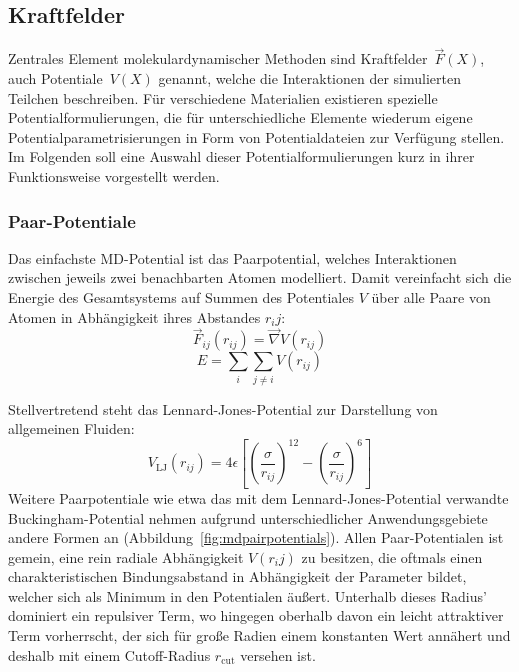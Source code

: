 \subsection{Kraftfelder}
\label{mdforcefields}

Zentrales Element molekulardynamischer Methoden sind Kraftfelder~$\vec F(X)$, auch Potentiale~$V(X)$ genannt, welche die Interaktionen der simulierten Teilchen beschreiben.
Für verschiedene Materialien existieren spezielle Potentialformulierungen, die für unterschiedliche Elemente wiederum eigene Potentialparametrisierungen in Form von Potentialdateien zur Verfügung stellen.
Im Folgenden soll eine Auswahl dieser Potentialformulierungen kurz in ihrer Funktionsweise vorgestellt werden.

\subsubsection{Paar-Potentiale}

Das einfachste MD-Potential ist das Paarpotential, welches Interaktionen zwischen jeweils zwei benachbarten Atomen modelliert.
Damit vereinfacht sich die Energie des Gesamtsystems auf Summen des Potentiales $V$ über alle Paare von Atomen in Abhängigkeit ihres Abstandes $r_ij$:
\begin{equation}
  \vec F_{ij}(r_{ij}) = \vec\nabla V(r_{ij})
\end{equation}
\begin{equation}
  E = \sum_i\sum_{j \neq i}{V(r_{ij})}
\end{equation}

Stellvertretend steht das Lennard-Jones-Potential zur Darstellung von allgemeinen Fluiden:
\begin{equation}
  V_\text{LJ}(r_{ij}) = 4 \epsilon \left[\left(\frac{\sigma}{r_{ij}}\right)^{12} - \left(\frac{\sigma}{r_{ij}}\right)^{6}\right]
\end{equation}
Weitere Paarpotentiale wie etwa das mit dem Lennard-Jones-Potential verwandte Bucking\-ham-Potential nehmen aufgrund unterschiedlicher Anwendungsgebiete andere Formen an (Abbildung~\ref{fig:mdpairpotentials}).
Allen Paar-Potentialen ist gemein, eine rein radiale Abhängigkeit $V(r_ij)$ zu besitzen, die oftmals einen charakteristischen Bindungsabstand in Abhängigkeit der Parameter bildet, welcher sich als Minimum in den Potentialen äußert.
Unterhalb dieses Radius' dominiert ein repulsiver Term, wo hingegen oberhalb davon ein leicht attraktiver Term vorherrscht, der sich für große Radien einem konstanten Wert annähert und deshalb mit einem Cutoff-Radius $r_\text{cut}$ versehen ist.

